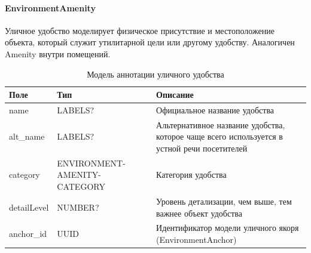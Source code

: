       \paragraph{EnvironmentAmenity}
        Уличное удобство моделирует физическое присутствие и местоположение объекта, который служит утилитарной цели или другому удобству. Аналогичен Amenity внутри помещений.
        \begin{center}
          \begin{xltabular}{\linewidth}{|l|p{4cm}|X|}
            \caption{Модель аннотации уличного удобства}\\\hline
            Поле        & Тип                          & Описание                                                                                    \\ \hline
            name        & LABELS?                      & Официальное название удобства                                                               \\ \hline
            alt\_name   & LABELS?                      & Альтернативное название удобства, которое чаще всего используется в устной речи посетителей \\ \hline
            category    & ENVIRONMENT-AMENITY-CATEGORY & Категория удобства                                                                          \\ \hline
            detailLevel & NUMBER?                      & Уровень детализации, чем выше, тем важнее объект удобства                                   \\ \hline
            anchor\_id  & UUID                         & Идентификатор модели уличного якоря (EnvironmentAnchor)                                     \\ \hline
          \end{xltabular}
        \end{center}

